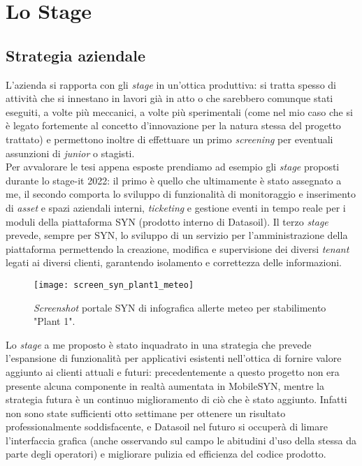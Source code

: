 
\chapter{Lo Stage}
\label{cap:lo-stage}
\section{Strategia aziendale}

L'azienda si rapporta con gli \textit{stage} in un'ottica produttiva: si tratta spesso di attività che si innestano in lavori già in atto o che sarebbero comunque stati eseguiti, a volte più meccanici, a volte più sperimentali (come nel mio caso che si è legato fortemente al concetto d'innovazione per la natura stessa del progetto trattato) e permettono inoltre di effettuare un primo \textit{screening} per eventuali assunzioni di \textit{junior} o stagisti.\\
Per avvalorare le tesi appena esposte prendiamo ad esempio gli \textit{stage} proposti durante lo stage-it 2022: il primo è quello che ultimamente è stato assegnato a me, il secondo comporta lo sviluppo di funzionalità di monitoraggio e inserimento di \textit{asset} e spazi aziendali interni, \textit{ticketing} e gestione eventi in tempo reale per i moduli della piattaforma SYN (prodotto interno di Datasoil). Il terzo \textit{stage} prevede, sempre per SYN, lo sviluppo di un servizio per l'amministrazione della piattaforma permettendo la creazione, modifica e supervisione dei diversi \textit{tenant} legati ai diversi clienti, garantendo isolamento e correttezza delle informazioni.\\
\begin{figure}[H]
    \centering
    \texttt{[image: screen\_syn\_plant1\_meteo]}
    \caption[Allerte meteo in SYN]{\textit{Screenshot} portale SYN di infografica allerte meteo per stabilimento "Plant 1".\footnotemark}
\end{figure}
Lo \textit{stage} a me proposto è stato inquadrato in una strategia che prevede l'espansione di funzionalità per applicativi esistenti nell'ottica di fornire valore aggiunto ai clienti attuali e futuri: precedentemente a questo progetto non era presente alcuna componente in realtà aumentata in MobileSYN, mentre la strategia futura è un continuo miglioramento di ciò che è stato aggiunto. Infatti non sono state sufficienti otto settimane per ottenere un risultato professionalmente soddisfacente, e Datasoil nel futuro si occuperà di limare l'interfaccia grafica (anche osservando sul campo le abitudini d'uso della stessa da parte degli operatori) e migliorare pulizia ed efficienza del codice prodotto.
